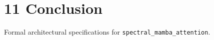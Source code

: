 \section{11 Conclusion}

Formal architectural specifications for \texttt{spectral_mamba_attention}.
